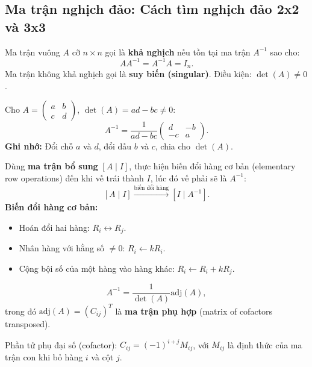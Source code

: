 \documentclass[12pt,a4paper]{article}
\begin{document}
\subsection{Ma trận nghịch đảo: Cách tìm nghịch đảo 2x2 và 3x3}

\begin{dinhnghia}[title={Ma trận nghịch đảo}]
  Ma trận vuông $A$ cỡ $n \times n$ gọi là \textbf{khả nghịch} nếu tồn tại ma trận $A^{-1}$ sao cho:
  \[
    A A^{-1} = A^{-1} A = I_n.
  \]
  Ma trận không khả nghịch gọi là \textbf{suy biến (singular)}. Điều kiện: $\det(A) \ne 0$.
\end{dinhnghia}

\begin{congthuc}[title={Nghịch đảo ma trận $2\times 2$}]
  Cho $A = \begin{pmatrix}a & b \\ c & d\end{pmatrix}$, $\det(A) = ad - bc \ne 0$:
  \[
    A^{-1} = \frac{1}{ad-bc}\begin{pmatrix}d & -b \\ -c & a\end{pmatrix}.
  \]
  \textbf{Ghi nhớ:} Đổi chỗ $a$ và $d$, đổi dấu $b$ và $c$, chia cho $\det(A)$.
\end{congthuc}

\begin{phuongphap}[title={Nghịch đảo ma trận $3\times 3$ bằng phép khử Gauss-Jordan}]
  Dùng \textbf{ma trận bổ sung} $[A \mid I]$, thực hiện biến đổi hàng cơ bản (elementary row operations) đến khi vế trái thành $I$, lúc đó vế phải sẽ là $A^{-1}$:
  \[
    [A \mid I] \xrightarrow{\text{biến đổi hàng}} [I \mid A^{-1}].
  \]
  \textbf{Biến đổi hàng cơ bản:}
  \begin{itemize}
    \item Hoán đổi hai hàng: $R_i \leftrightarrow R_j$.
    \item Nhân hàng với hằng số $\ne 0$: $R_i \leftarrow k R_i$.
    \item Cộng bội số của một hàng vào hàng khác: $R_i \leftarrow R_i + k R_j$.
  \end{itemize}
\end{phuongphap}

\begin{congthuc}[title={Nghịch đảo bằng công thức định thức (ma trận phụ hợp)}]
  \[
    A^{-1} = \frac{1}{\det(A)} \text{adj}(A),
  \]
  trong đó $\text{adj}(A) = (C_{ij})^T$ là \textbf{ma trận phụ hợp} (matrix of cofactors transposed).

  Phần tử phụ đại số (cofactor): $C_{ij} = (-1)^{i+j} M_{ij}$, với $M_{ij}$ là định thức của ma trận con khi bỏ hàng $i$ và cột $j$.
\end{congthuc}
\end{document}
